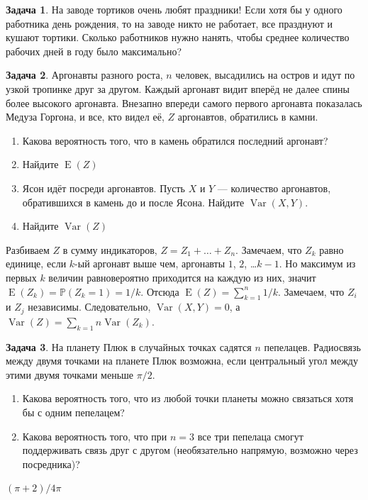 \documentclass[nobib]{tufte-handout}
\theoremstyle{definition}
\newtheorem{problem}{Задача}
\DeclareMathOperator{\Var}{Var}
\DeclareMathOperator{\Cov}{Var}
\DeclareMathOperator{\E}{E}
\renewcommand{\P}{\mathbb{P}}
\begin{document}
\begin{problem}
На заводе тортиков очень любят праздники! Если хотя бы у одного работника день рождения, то на заводе никто не работает, все празднуют и кушают тортики. Сколько работников нужно нанять, чтобы среднее количество рабочих дней в году было максимально?

\begin{sol}

\end{sol}

\end{problem}


\begin{problem}
Аргонавты разного роста, $n$ человек, высадились на остров и идут по узкой тропинке друг за другом. Каждый аргонавт видит вперёд не далее спины более высокого аргонавта. Внезапно впереди самого первого аргонавта показалась Медуза Горгона, и все, кто видел её, $Z$ аргонавтов, обратились в камни.

\begin{enumerate}
\item Какова вероятность того, что в камень обратился последний аргонавт?
\item Найдите $\E(Z)$
\item Ясон идёт посреди аргонавтов. Пусть $X$ и $Y$ — количество аргонавтов, обратившихся в камень до и после Ясона. Найдите $\Cov(X,Y)$.
\item Найдите $\Var(Z)$
\end{enumerate}


\begin{sol}
Разбиваем $Z$ в сумму индикаторов, $Z=Z_1 + \ldots + Z_n$. Замечаем, что $Z_k$ равно единице, если $k$-ый аргонавт выше чем, аргонавты $1$, $2$, \ldots $k-1$. Но максимум из первых $k$ величин равновероятно приходится на каждую из них, значит $\E(Z_k)=\P(Z_k=1)=1/k$. Отсюда $\E(Z)=\sum_{k=1}^n 1/k$. Замечаем, что $Z_i$ и $Z_j$ независимы. Следовательно, $\Cov(X,Y)=0$, а $\Var(Z)=\sum_{k=1}n \Var(Z_k)$.
\end{sol}


\end{problem}


\begin{problem}
На планету Плюк в случайных точках садятся $n$ пепелацев. Радиосвязь между двумя точками на планете Плюк возможна, если центральный угол между этими двумя точками меньше $\pi/2$.

\begin{enumerate}
\item Какова вероятность того, что из любой точки планеты можно связаться хотя бы с одним пепелацем?
\item Какова вероятность того, что при $n=3$ все три пепелаца смогут поддерживать связь друг с другом (необязательно напрямую, возможно через посредника)?
\end{enumerate}

\begin{sol}
$(\pi+2)/4\pi$
\end{sol}

\end{problem}
\end{document}
